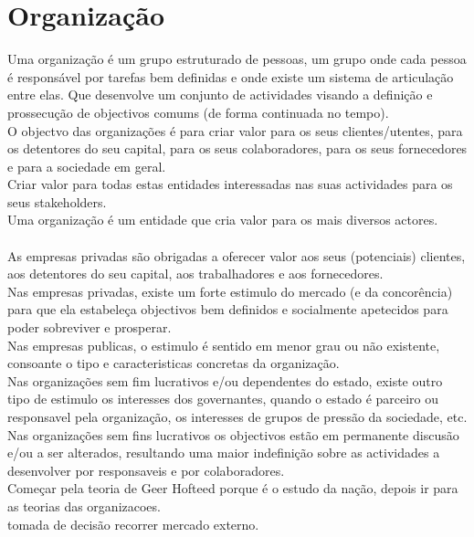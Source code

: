 \section{Organização}
Uma organização é um grupo estruturado de pessoas, um grupo onde cada pessoa é responsável por tarefas bem definidas e onde existe um sistema de articulação entre elas. Que desenvolve um conjunto de actividades visando a definição e prossecução de objectivos comums (de forma continuada no tempo).\\

O objectvo das organizações é para criar valor para os seus clientes/utentes, para os detentores do seu capital, para os seus colaboradores, para os seus fornecedores e para a sociedade em geral.\\
Criar valor para todas estas entidades interessadas nas suas actividades para os seus stakeholders.\\
Uma organização é um entidade que cria valor para os mais diversos actores.\\ \\

As empresas privadas são obrigadas a oferecer valor aos seus (potenciais) clientes, aos detentores do seu capital, aos trabalhadores e aos fornecedores.\\
Nas empresas privadas, existe um forte estimulo do mercado (e da concorência) para que ela estabeleça objectivos bem definidos e socialmente apetecidos para poder sobreviver e prosperar.\\

Nas empresas publicas, o estimulo é sentido em menor grau ou não existente, consoante o tipo e caracteristicas concretas da organização.\\

Nas organizações sem fim lucrativos e/ou dependentes do estado, existe outro tipo de estimulo os interesses dos governantes, quando o estado é parceiro ou responsavel pela organização, os interesses de grupos de pressão da sociedade, etc.\\

Nas organizações sem fins lucrativos os objectivos estão em permanente discusão e/ou a ser alterados, resultando uma maior indefinição sobre as actividades a desenvolver por responsaveis e por colaboradores.\\

Começar pela teoria de Geer Hofteed porque é o estudo da nação, depois ir para as teorias das organizacoes.\\
tomada de decisão recorrer mercado externo.\\

